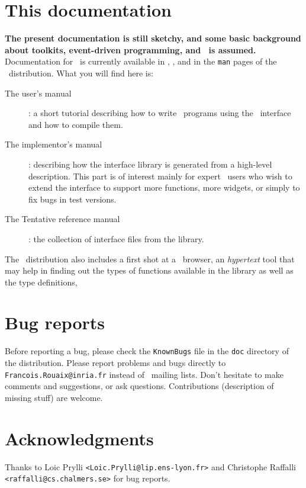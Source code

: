 \section*{This documentation}

{\bf The present documentation is still sketchy, and some basic background
about toolkits, event-driven programming, and \tk\ is assumed.}
Documentation for \tk\ is currently available in \cite{ouster94},
\cite{welch94}, and in the {\tt man} pages of the \tk\ distribution.
What you will find here is:
\begin{description}
\item[The user's manual] : a short tutorial describing how to write \caml\
programs using the \tk\ interface and how to compile them. 
\item[The implementor's manual] : describing how the interface library is
generated from a high-level description. This part is of interest mainly for
expert \tk\ users who wish to extend the interface to support more
functions, more widgets, or simply to fix bugs in test versions.
\item[The Tentative reference manual] : the collection of interface files
from the library.
\end{description}

The \camltk\ distribution also includes a first shot at a \caml\ browser,
an {\em hypertext} tool that may help in finding out the types of functions
available in the library as well as the type definitions, 

\section*{Bug reports}

Before reporting a bug, please check the \verb|KnownBugs| file in the
\verb|doc| directory of the distribution.
Please report problems and bugs directly to \verb|Francois.Rouaix@inria.fr|
instead of \caml\ mailing lists.
Don't hesitate to make comments and suggestions, or ask questions.
Contributions (description of missing stuff) are welcome.

\section*{Acknowledgments}
Thanks to Loic Prylli \verb|<Loic.Prylli@lip.ens-lyon.fr>| \newline
      and Christophe Raffalli \verb|<raffalli@cs.chalmers.se>|
for bug reports.

